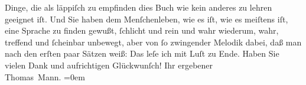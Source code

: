 \begin{ledgroupsized}[t]{13cm}
                    Dinge, die als läppiſch zu empfinden dies Buch wie kein anderes zu lehren geeignet iſt. Und Sie
                    haben dem Menſchenleben, wie es iſt, wie es meiſtens iſt, eine Sprache zu finden
                    gewußt, ſchlicht und rein und wahr wiederum, wahr, treffend und ſcheinbar
                    unbewegt, aber von ſo zwingender Melodik dabei, daß man nach den erſten paar
                    Sätzen weiß: Das leſe ich mit Luſt zu Ende. Haben Sie vielen Dank und
                    aufrichtigen Glückwunſch!\pend
           \pstart
           Ihr ergebener{\\[\baselineskip]}\spacefill\mbox{Thomas Mann.}\pend
           \leftskip=0em{}
         
         \endnumbering{}\end{ledgroupsized}  \newcommand{\dateiname}{L02501}\newcommand{\titel}{Thomas Mann an Arthur Schnitzler, 28. 5. 1928}\newcommand{\editorInnen}{Martin Anton Müller und Gerd-Hermann Susen}
      
